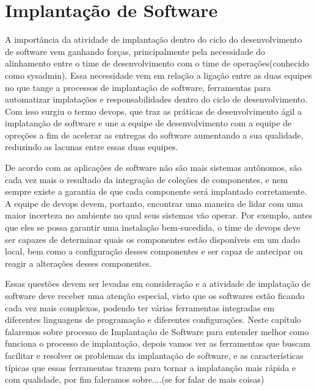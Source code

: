 \chapter{Implantação de Software}
\label{cap-implantacao}


A importância da atividade de implantação dentro do ciclo do desenvolvimento
de software vem ganhando forças, principalmente pela necessidade do alinhamento
entre o time de desenvolvimento com o time de operações(conhecido como sysadmin).
Essa necessidade vem em relação a ligação entre as duas equipes no que tange a
processos de implantação de software, ferramentas para automatizar implatações
e responsabilidades dentro do ciclo de desenvolvimento. Com isso surgiu o termo devops, que
traz as práticas de desenvolvimento ágil a implatanção de software e une a equipe de desenvolvimento
com a equipe de opreções a fim de acelerar as entregas do software aumentando
a sua qualidade, reduzindo as lacunas entre essas duas equipes.

De acordo com \cite{deployment1998} as aplicações de software não são mais
sistemas autônomos, são cada vez mais o resultado da integração de coleções de
componentes, e nem sempre existe a garantia de que cada componente será implantado
corretamente. A equipe de devops devem, portanto, encontrar uma maneira de lidar
com uma maior incerteza no ambiente no qual seus sistemas vão operar.
Por exemplo, antes que eles se possa garantir uma instalação bem-sucedida, o time
de devops deve ser capazes de determinar quais os componentes estão disponíveis
 em um dado local, bem como a configuração desses componentes e ser capaz de
antecipar ou reagir a alterações desses componentes.

Essas questões  devem ser levadas em consideração e a atividade de implatação de
software deve receber uma atenção especial, visto que os softwares estão ficando
cada vez mais complexos, podendo ter várias ferramentas integradas em diferentes
linguagens de programação e diferentes configurações. Neste capítulo falaremos
sobre processo de Implantação de Software
para entender melhor como funciona o processo de implantação, depois vamos ver as
ferramentas que buscam facilitar  e resolver os problemas da implantação de software,
e as características típicas que essas ferramentas trazem para tornar a implatanção
mais rápida e com qualidade, por fim faleramos sobre....(se for falar de mais coisas)

